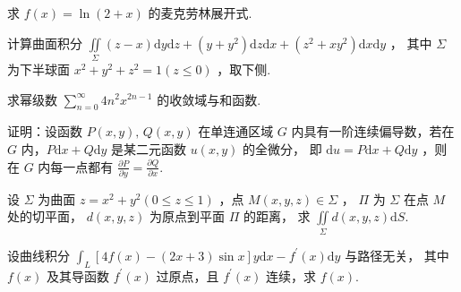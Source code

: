 \begin{problem}[points = 8]
求 $f(x) = \ln{(2 + x)}$ 的麦克劳林展开式.
\end{problem}

\begin{problem}[points = 8]
计算曲面积分 $\iint\limits_\Sigma (z - x)\mathrm{d}y\mathrm{d}z + (y + y^2)\mathrm{d}z\mathrm{d}x + (z^2 + xy^2)\mathrm{d}x\mathrm{d}y$ ，
其中 $\Sigma$ 为下半球面 $x^2 + y^2 + z^2 = 1(z \leq 0)$ ，取下侧.
\end{problem}

\begin{problem}[points = 8]
求幂级数 $\sum\limits_{n = 0}^{\infty} 4n^2x^{2n - 1}$ 的收敛域与和函数.
\end{problem}

\begin{problem}[points = 5]
证明：设函数 $P(x, y),\, Q(x, y)$ 在单连通区域 $G$ 内具有一阶连续偏导数，若在 $G$ 内，$P\mathrm{d}x + Q\mathrm{d}y$ 是某二元函数 $u(x, y)$ 的全微分，
即 $\mathrm{d}u = P\mathrm{d}x + Q\mathrm{d}y$ ，则在 $G$ 内每一点都有 $\frac{\partial P}{\partial y} = \frac{\partial Q}{\partial x}$.
\end{problem}

\begin{problem}[points = 6]
设 $\Sigma$ 为曲面 $z = x^2 + y^2(0 \leq z \leq 1)$ ，点 $M(x, y, z) \in \Sigma$ ，
$\Pi$ 为 $\Sigma$ 在点 $M$ 处的切平面， $d(x, y, z)$ 为原点到平面 $\Pi$ 的距离，
求 $\iint\limits_\Sigma d(x, y, z)\mathrm{d}S$.
\end{problem}

\begin{problem}[points = 8]
设曲线积分 $\int_L [4f(x) - (2x + 3)\sin{x}]y\mathrm{d}x - f^{\prime}(x)\mathrm{d}y$ 与路径无关，
其中 $f(x)$ 及其导函数 $f^{\prime}(x)$ 过原点，且 $f^{\prime}(x)$ 连续，求 $f(x)$.
\end{problem}
